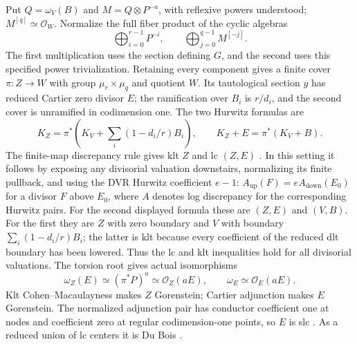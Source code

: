 Put $Q=\omega_V(B)$ and $M=Q\otimes P^{-a}$, with reflexive powers
understood; $M^{[q]}\simeq\mathcal O_W$.  Normalize the full fiber
product of the cyclic algebras
\[
 \bigoplus_{i=0}^{r-1}P^{-i},\qquad
 \bigoplus_{j=0}^{q-1}M^{[-j]}.
\]
The first multiplication uses the section defining $G$, and the second
uses this specified power trivialization.  Retaining every component
gives a finite cover $\pi:Z\to W$ with group
$\mu_r\times\mu_q$ and quotient $W$.  Its tautological section $y$
has reduced Cartier zero divisor $E$; the ramification over $B_i$ is
$r/d_i$, and the second cover is unramified in codimension one.
The two Hurwitz formulas are
\[
 K_Z=\pi^*\left(K_V+\sum_i(1-d_i/r)B_i\right),\qquad
 K_Z+E=\pi^*(K_V+B).
\]
The finite-map discrepancy rule gives klt $Z$ and lc $(Z,E)$
\cite[Proposition~5.20]{KollarMori1998}.  In this setting it follows by exposing
any divisorial valuation downstairs, normalizing its finite pullback,
and using the DVR Hurwitz coefficient $e-1$:
$A_{\mathrm{up}}(F)=eA_{\mathrm{down}}(E_0)$ for a divisor
$F$ above $E_0$, where $A$ denotes log discrepancy for the
corresponding Hurwitz pairs.  For the second displayed formula
these are $(Z,E)$ and $(V,B)$.  For the first they are $Z$ with
zero boundary and $V$ with boundary
$\sum_i(1-d_i/r)B_i$; the latter is klt because every coefficient
of the reduced dlt boundary has been lowered.  Thus the lc and
klt inequalities hold for all divisorial valuations.
The torsion root gives actual
isomorphisms
\begin{equation}\label{nu2:eq:adjunction}
 \omega_Z(E)\simeq(\pi^*P)^a\simeq\mathcal O_Z(aE),
 \qquad\omega_E\simeq\mathcal O_E(aE).
\end{equation}
Klt Cohen--Macaulayness makes $Z$ Gorenstein; Cartier adjunction
makes $E$ Gorenstein.  The normalized adjunction pair has conductor
coefficient one at nodes and coefficient zero at regular
codimension-one points, so $E$ is slc
\cite[Lemma~11.16 and Theorem~11.17]{Kollar2023}.  As a reduced union of lc
centers it is Du Bois \cite[Theorem~1.4]{KollarKovacs2010}.

